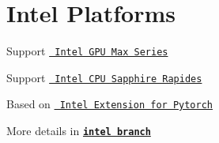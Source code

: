 \chapter{Intel Platforms}
\hypertarget{md_docs_2_intel}{}\label{md_docs_2_intel}
\label{md_docs_2_intel_autotoc_md27}%
%



\begin{DoxyItemize}
\item Support \href{https://www.intel.com/content/www/us/en/products/details/discrete-gpus/data-center-gpu/max-series.html}{\texttt{ Intel GPU Max Series}} ~\newline

\item Support \href{https://ark.intel.com/content/www/us/en/ark/products/codename/126212/products-formerly-sapphire-rapids.html}{\texttt{ Intel CPU Sapphire Rapides}} ~\newline

\item Based on \href{https://intel.github.io/intel-extension-for-pytorch}{\texttt{ Intel Extension for Pytorch}} ~\newline

\end{DoxyItemize}

More details in \href{https://github.com/haotian-liu/LLaVA/tree/intel/docs/intel}{\texttt{ {\bfseries{intel branch}}}} 